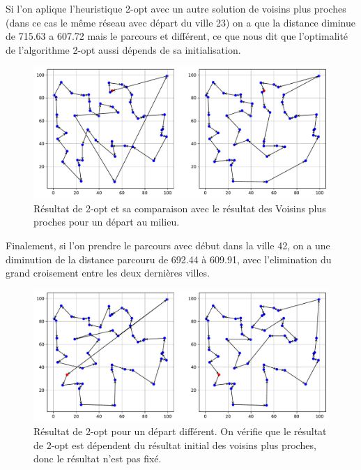 \documentclass[a4paper,11pt,fleqn]{article}
\begin{document}
Si l'on aplique l'heuristique 2-opt avec un autre solution de voisins plus proches (dans ce cas le même réseau avec départ du ville 23) on a que la distance diminue de 715.63 a 607.72 mais le parcours et différent, ce que nous dit que l'optimalité de l'algorithme 2-opt aussi dépends de sa initialisation.

\begin{figure}[H]
    \centering
    \includegraphics[width=\textwidth]{images/2opt_50_villes_depart_23.pdf}
    \caption{Résultat de 2-opt et sa comparaison avec le résultat des Voisins plus proches pour un départ au milieu.}
    \label{fig:2opt-dep23}
\end{figure}

Finalement, si l'on prendre le parcours avec début dans la ville 42, on a une diminution de la distance parcouru de 692.44 à 609.91, avec l'elimination du grand croisement entre les deux dernières villes.

\begin{figure}[H]
    \centering
    \includegraphics[width=\textwidth]{images/2opt_50_villes_depart_42.pdf}
    \caption{Résultat de 2-opt pour un départ différent. On vérifie que le résultat de 2-opt est dépendent du résultat initial des voisins plus proches, donc le résultat n'est pas fixé.}
    \label{fig:2opt-dep42}
\end{figure}
\end{document}
